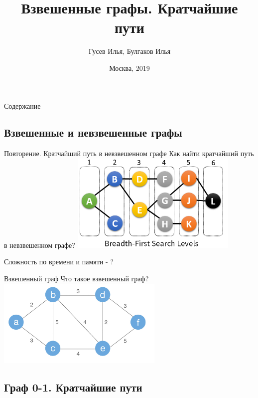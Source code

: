 \documentclass[10pt]{beamer}
\title[\href{https://goo.gl/NRgp8K}{https://goo.gl/NRgp8K} (Term 1)]{Взвешенные графы. Кратчайшие пути}
\author[Гусев Илья, Булгаков Илья]{Гусев Илья, Булгаков Илья}
\institute[МФТИ] 
{Московский физико-технический институт\\*}
\date{Москва, 2019}
\begin{document}
\begin{frame}
  \titlepage
\end{frame}

\begin{frame}{Содержание}
\tableofcontents
\end{frame}

\subsection{Взвешенные и невзвешенные графы}

\begin{frame}[fragile]{Повторение. Кратчайший путь в невзвешенном графе}
Как найти кратчайший путь в невзвешенном графе?
    \includegraphics[width=8cm]{Term_2/Source/images/bfs_2_lvl.png}
    
Сложность по времени и памяти - ?

\end{frame}

\begin{frame}[fragile]{Взвешенный граф}
Что такое взвешенный граф?
    \includegraphics[width=8cm]{Term_2/Source/images/weigted_graph.jpg}
\end{frame}

\subsection{Граф 0-1. Кратчайшие пути}
\end{document}
